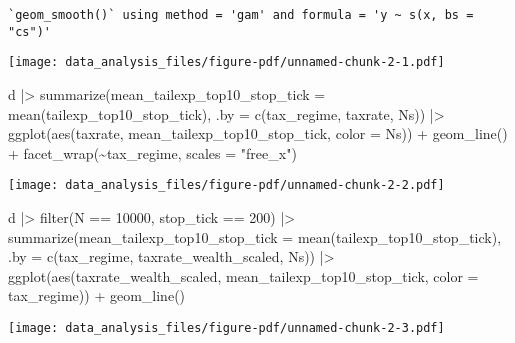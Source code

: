\documentclass[
  letterpaper,
  DIV=11,
  numbers=noendperiod]{scrartcl}
\newenvironment{Shaded}{\begin{snugshade}}{\end{snugshade}}
\newcommand{\AttributeTok}[1]{\textcolor[rgb]{0.40,0.45,0.13}{#1}}
\newcommand{\DecValTok}[1]{\textcolor[rgb]{0.68,0.00,0.00}{#1}}
\newcommand{\FunctionTok}[1]{\textcolor[rgb]{0.28,0.35,0.67}{#1}}
\newcommand{\NormalTok}[1]{\textcolor[rgb]{0.00,0.23,0.31}{#1}}
\newcommand{\SpecialCharTok}[1]{\textcolor[rgb]{0.37,0.37,0.37}{#1}}
\newcommand{\StringTok}[1]{\textcolor[rgb]{0.13,0.47,0.30}{#1}}
\begin{document}
\begin{verbatim}
`geom_smooth()` using method = 'gam' and formula = 'y ~ s(x, bs = "cs")'
\end{verbatim}

\texttt{[image: data\_analysis\_files/figure-pdf/unnamed-chunk-2-1.pdf]}

\begin{Shaded}
\begin{Highlighting}[]
\NormalTok{d }\SpecialCharTok{|\textgreater{}} \FunctionTok{summarize}\NormalTok{(}\AttributeTok{mean\_tailexp\_top10\_stop\_tick =} \FunctionTok{mean}\NormalTok{(tailexp\_top10\_stop\_tick), }\AttributeTok{.by =} \FunctionTok{c}\NormalTok{(tax\_regime, taxrate, Ns)) }\SpecialCharTok{|\textgreater{}} 
 \FunctionTok{ggplot}\NormalTok{(}\FunctionTok{aes}\NormalTok{(taxrate, mean\_tailexp\_top10\_stop\_tick, }\AttributeTok{color =}\NormalTok{ Ns)) }\SpecialCharTok{+} 
 \FunctionTok{geom\_line}\NormalTok{() }\SpecialCharTok{+}
 \FunctionTok{facet\_wrap}\NormalTok{(}\SpecialCharTok{\textasciitilde{}}\NormalTok{tax\_regime, }\AttributeTok{scales =} \StringTok{"free\_x"}\NormalTok{)}
\end{Highlighting}
\end{Shaded}

\texttt{[image: data\_analysis\_files/figure-pdf/unnamed-chunk-2-2.pdf]}

\begin{Shaded}
\begin{Highlighting}[]
\NormalTok{d }\SpecialCharTok{|\textgreater{}} \FunctionTok{filter}\NormalTok{(N }\SpecialCharTok{==} \DecValTok{10000}\NormalTok{, stop\_tick }\SpecialCharTok{==} \DecValTok{200}\NormalTok{) }\SpecialCharTok{|\textgreater{}} 
 \FunctionTok{summarize}\NormalTok{(}\AttributeTok{mean\_tailexp\_top10\_stop\_tick =} \FunctionTok{mean}\NormalTok{(tailexp\_top10\_stop\_tick), }\AttributeTok{.by =} \FunctionTok{c}\NormalTok{(tax\_regime, taxrate\_wealth\_scaled, Ns)) }\SpecialCharTok{|\textgreater{}} 
 \FunctionTok{ggplot}\NormalTok{(}\FunctionTok{aes}\NormalTok{(taxrate\_wealth\_scaled, mean\_tailexp\_top10\_stop\_tick, }\AttributeTok{color =}\NormalTok{ tax\_regime)) }\SpecialCharTok{+} 
 \FunctionTok{geom\_line}\NormalTok{()}
\end{Highlighting}
\end{Shaded}

\texttt{[image: data\_analysis\_files/figure-pdf/unnamed-chunk-2-3.pdf]}
\end{document}
